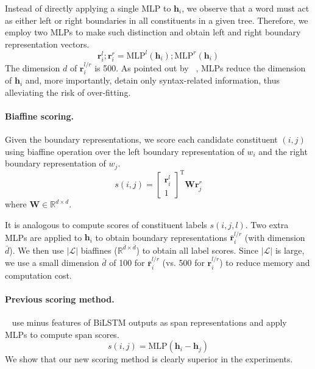 \documentclass{article}
\begin{document}
Instead of directly applying a single MLP to $\mathbf{h}_i$,
we observe that a word must act as either left or right boundaries in all constituents in a given tree.
Therefore, we employ two MLPs to make such distinction and obtain left and right boundary representation vectors.
\begin{equation}
\label{mlp-borlders}
\mathbf{r}_i^{l}; \mathbf{r}_i^{r} =\mathrm{MLP}^{l} \left( \mathbf{h}_i \right); \mathrm{MLP}^{r} \left( \mathbf{h}_i \right)
\end{equation}
The dimension $d$ of $\mathbf{r}_i^{l/r}$ is 500.
As pointed out by \citeauthor{Timothy-d17-biaffine}~, MLPs reduce the dimension of $\mathbf{h}_i$ and, more importantly, detain only syntax-related information, thus alleviating the risk of over-fitting.


\paragraph{Biaffine scoring.}

Given the boundary representations,
we score each candidate constituent $(i,j)$ using biaffine operation
over the left boundary representation of $w_i$ and the right boundary representation of $w_j$.
\begin{equation} \label{equation:biaffine}
s(i,j) =  \left[
\begin{array}{c}
  \mathbf{r}_{i}^{l} \\
    1
\end{array}
\right]^\mathrm{T}
\mathbf{W} \mathbf{r}_{j}^{r}
\end{equation}
where $\mathbf{W} \in \mathbb{R}^{d \times d}$.


It is analogous to compute scores of constituent labels $s(i,j,l)$.
Two extra MLPs are applied to $\mathbf{h}_i$ to obtain boundary representations $\bar{\mathbf{r}}^{l/r}_i$ (with dimension $\bar{d}$).
We then use $|\mathcal{L}|$ biaffines ($\mathbb{R}^{\bar{d} \times \bar{d}}$) to obtain all label scores.
Since $|\mathcal{L}|$ is large, we use a small dimension $\bar{d}$ of 100 for $\bar{\mathbf{r}}^{l/r}_i$ (vs. 500 for ${\mathbf{r}}^{l/r}_i$) to reduce memory and computation cost.

\paragraph{Previous scoring method.}
\citeauthor{stern-etal-2017-minimal}~ use minus features of BiLSTM outputs as span representations \cite{wang-chang-2016-graph,cross-huang-2016-span} and apply MLPs to compute span scores.
\begin{equation} \label{equation:minus-score}
s(i,j)=\mathrm{MLP}(\mathbf{h}_{i}-\mathbf{h}_{j})
\end{equation}
We show that our new scoring method is clearly superior in the experiments.
\end{document}
